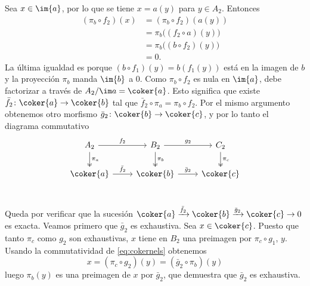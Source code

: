 \documentclass[12pt]{article}
\begin{document}
Sea \( x \in \im{a} \), por lo que se tiene \( x = a(y) \) para \( y \in A_2 \). Entonces 
\begin{align*}
	(\pi_b \circ f_2)(x) & = (\pi_b \circ f_2)(a(y)) \\
											 & = \pi_b\big((f_2 \circ a)(y)\big) \\
											 & = \pi_b\big((b \circ f_2)(y)\big) \\
											 & = 0.
\end{align*}
La última igualdad es porque \( (b \circ f_1)(y) = b(f_1(y)) \) está en la imagen de \( b
\) y la proyección \( \pi_b \) manda \( \im{b} \) a 0. Como \( \pi_b \circ f_2 \) es nula
en \( \im{a} \), debe factorizar a través de \( A_2/\im a = \coker{a} \). Esto significa
que existe \( \bar{f}_2 \colon \coker{a} \to \coker{b} \) tal que \( \bar{f}_2 \circ \pi_a
= \pi_b \circ f_2 \). Por el mismo argumento obtenemos otro morfismo \( \bar{g}_2 \colon
\coker{b} \to \coker{c} \), y por lo tanto el diagrama commutativo
\begin{equation}\label{eq:cokernels}
	\begin{tikzcd}
		A_2 \arrow[d, "\pi_a", two heads] \arrow[r, "f_2"] & B_2 \arrow[d, "\pi_b", two heads]
		\arrow[r, "g_2"] & C_2 \arrow[d, "\pi_c", two heads] \\
		\coker{a} \arrow[r, "\bar{f}_2"] & \coker{b} \arrow[r, "\bar{g}_2"]  & \coker{c} \\
	\end{tikzcd}
\end{equation}

Queda por verificar que la sucesión \( \coker{a} \xrightarrow{\bar{f}_2} \coker{b}
\xrightarrow{\bar{g}_2} \coker{c} \to 0 \) es exacta. Veamos primero que \( \bar{g}_2 \)
es exhaustiva. Sea \( x \in \coker{c} \). Puesto que tanto \( \pi_c \) como \( g_2 \) son
exhaustivas, \( x \) tiene en \( B_2 \) una preimagen por \( \pi_c \circ g_1 \), \( y \).
Usando la commutatividad de \eqref{eq:cokernels} obtenemos
\begin{equation*}
	x = (\pi_c \circ g_2)(y) = (\bar{g}_2 \circ \pi_b)(y)
\end{equation*}
luego \( \pi_b(y) \) es una preimagen de \( x \) por \( \bar{g}_2 \), que demuestra que \(
\bar{g}_2 \) es exhaustiva.
\end{document}
